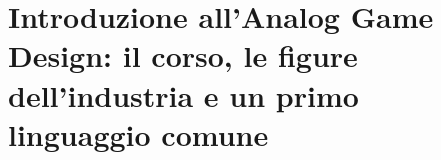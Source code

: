 %
%
%    
%

\chapter[Introduzione all'Analog Game Design]{Introduzione all'Analog Game
Design: il corso, le figure dell'industria e un primo linguaggio comune}
\label{a1:cap:intro}

